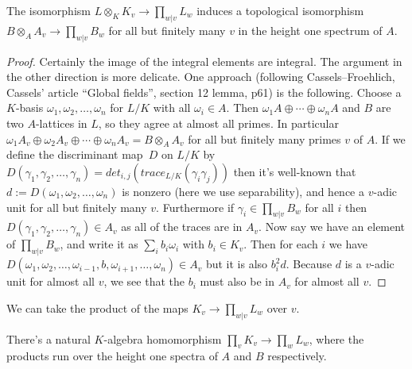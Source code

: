 \begin{theorem}
  \label{IsDedekindDomain.HeightOneSpectrum.adicCompletionComapAlgEquiv_integral}
  The isomorphism $L\otimes_KK_v\to\prod_{w|v}L_w$ induces a topological isomorphism
  $B\otimes_AA_v\to \prod_{w|v}B_w$
  for all but finitely many $v$ in the height one spectrum of $A$.
\end{theorem}
\begin{proof}
  Certainly the image of the integral elements are integral. The argument in the other
  direction is more delicate. One approach (following Cassels--Froehlich, Cassels' article
  ``Global fields'', section 12 lemma, p61) is the following. Choose a $K$-basis
  $\omega_1,\omega_2,\ldots,\omega_n$ for $L/K$ with all $\omega_i\in A$.
  Then $\omega_1A\oplus\cdots\oplus\omega_nA$ and
  $B$ are two $A$-lattices in $L$, so they agree at almost all primes. In particular
  $\omega_1A_v\oplus\omega_2A_v\oplus\cdots\oplus\omega_nA_v=B\otimes_AA_v$ for all but
  finitely many primes $v$ of $A$. If we define the discriminant map~$D$ on $L/K$
  by $D(\gamma_1,\gamma_2,\ldots,\gamma_n)=det_{i,j}(trace_{L/K}(\gamma_i\gamma_j))$
  then it's well-known that $d:=D(\omega_1,\omega_2,\ldots,\omega_n)$ is nonzero (here we use
  separability), and hence a $v$-adic unit for all but finitely many $v$. Furthermore if
  $\gamma_i\in \prod_{w|v}B_w$ for all $i$ then $D(\gamma_1,\gamma_2,\ldots,\gamma_n)\in A_v$
  as all of the traces are in $A_v$. Now say
  we have an element of $\prod_{w|v}B_w$, and write it as $\sum_i b_i\omega_i$ with
  $b_i\in K_v$. Then for each $i$ we have
  $D(\omega_1,\omega_2,\ldots,\omega_{i-1},b,\omega_{i+1},\ldots,\omega_n)\in A_v$
  but it is also $b_i^2d$. Because $d$ is a $v$-adic unit for almost all $v$, we
  see that the $b_i$ must also be in $A_v$ for almost all $v$.
\end{proof}

We can take the product of the maps $K_v\to\prod_{w|v}L_w$ over $v$.

\begin{definition}
  \label{DedekindDomain.ProdAdicCompletions.baseChange}
  There's a natural $K$-algebra homomorphism $\prod_v K_v\to\prod_w L_w$, where the
  products run over the height one spectra of $A$ and $B$ respectively.
\end{definition}


